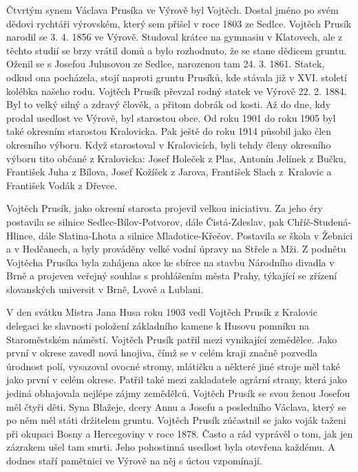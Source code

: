 \documentclass[../dejiny-rodu-prusiku.tex]{subfiles}
\begin{document}
Čtvrtým synem Václava Prusíka ve Výrově byl Vojtěch. Dostal jméno po svém dědovi rychtáři výrovském, který sem přišel v roce 1803 ze Sedlce. Vojtěch Prusík narodil se 3. 4. 1856 ve Výrově. Studoval krátce na gymnasiu v Klatovech, ale z těchto studií se brzy vrátil domů a bylo rozhodnuto, že se stane dědicem gruntu. Oženil se s Josefou Julusovou ze Sedlce, narozenou tam 24. 3. 1861. Statek, odkud ona pocházela, stojí naproti gruntu Prusíků, kde stávala již v XVI. století kolébka našeho rodu. Vojtěch Prusík převzal rodný statek ve Výrově 22. 2. 1884. Byl to velký silný a zdravý člověk, a přitom dobrák od kosti. Až do dne, kdy prodal used­lost ve Výrově, byl starostou obce. Od roku 1901 do roku 1905 byl také okresním starostou Kralovicka. Pak ještě do roku 1914 působil jako člen okresního výboru. Když starostoval v Kralovicích, byli tehdy členy okres­ního výboru tito občané z Kralovicka: Josef Holeček z Plas, Antonín Jelínek z Bučku, František Juha z Bílova, Josef Kožíšek z Jarova, František Slach z Kralovic a František Vodák z Dřevce.

Vojtěch Prusík, jako okresní starosta projevil velkou iniciativu. Za jeho éry postavila se silnice Sedlec-Bílov-Potvorov, dále Čistá-Zdeslav, pak Chříč-Studená-Hlince, dále Slatina-Lhota a silnice Mladotice-Křečov. Postavila se škola v Žebnici a v Hedčanech, a byly prováděny velké vodní úpravy na Střele a Mži. Z podnětu Vojtěcha Prusíka byla zahájena akce ke sbír­ce na stavbu Národního divadla v Brně a projeven veřej­ný souhlas s prohlášením města Prahy, týkající se zří­zení slovanských universit v Brně, Lvově a Lublani.

V den svátku Mistra Jana Husa roku 1903 vedl Vojtěch Prusík z Kralovic delegaci ke slavnosti položení základ­ního kamene k Husovu pomníku na Staroměstském náměstí. Vojtěch Prusík patřil mezi vynikající zemědělce. Jako první v okrese zavedl nová hnojiva, čímž se v celém kraji značně pozvedla úrodnost polí, vysazoval ovocné stromy, mlátičku a některé jiné stroje měl také jako první v celém okrese. Patřil také mezi zakladatele agrární strany, která jako jediná obhajovala nejlépe zájmy zemědělců. Vojtěch Prusík se svou ženou Josefou měl čtyři děti. Syna Blažeje, dcery Annu a Josefu a posledního Václava, který se po něm měl státi držitelem gruntu. Vojtěch Prusík zúčastnil se jako voják taženi při okupaci Bosny a Hercegoviny v roce 1878. Často a rád vyprávěl o tom, jak jen zázrakem ušel tam smrti. Jeho pohostinná usedlost byla otevřena každému. A dodnes staří pamětnici ve Výrově na něj s úctou vzpomínají.
\end{document}
